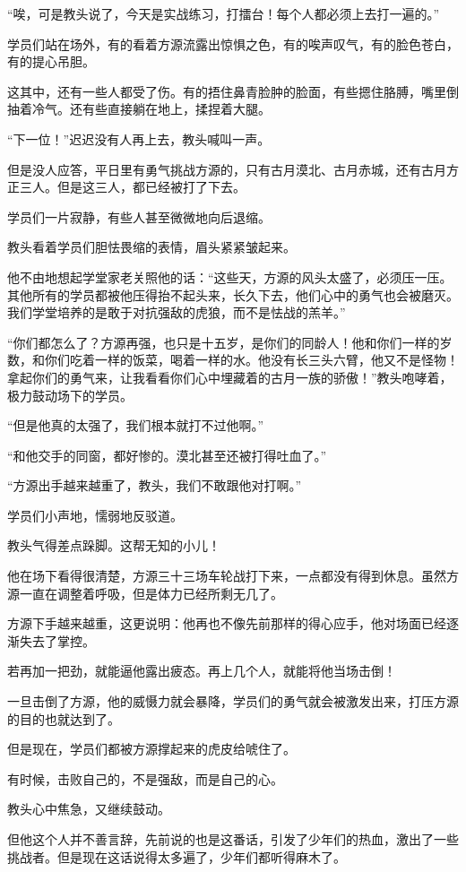\begin{this_body}
“唉，可是教头说了，今天是实战练习，打擂台！每个人都必须上去打一遍的。”

学员们站在场外，有的看着方源流露出惊惧之色，有的唉声叹气，有的脸色苍白，有的提心吊胆。

这其中，还有一些人都受了伤。有的捂住鼻青脸肿的脸面，有些摁住胳膊，嘴里倒抽着冷气。还有些直接躺在地上，揉捏着大腿。

“下一位！”迟迟没有人再上去，教头喊叫一声。

但是没人应答，平日里有勇气挑战方源的，只有古月漠北、古月赤城，还有古月方正三人。但是这三人，都已经被打了下去。

学员们一片寂静，有些人甚至微微地向后退缩。

教头看着学员们胆怯畏缩的表情，眉头紧紧皱起来。

他不由地想起学堂家老关照他的话：“这些天，方源的风头太盛了，必须压一压。其他所有的学员都被他压得抬不起头来，长久下去，他们心中的勇气也会被磨灭。我们学堂培养的是敢于对抗强敌的虎狼，而不是怯战的羔羊。”

“你们都怎么了？方源再强，也只是十五岁，是你们的同龄人！他和你们一样的岁数，和你们吃着一样的饭菜，喝着一样的水。他没有长三头六臂，他又不是怪物！拿起你们的勇气来，让我看看你们心中埋藏着的古月一族的骄傲！”教头咆哮着，极力鼓动场下的学员。

“但是他真的太强了，我们根本就打不过他啊。”

“和他交手的同窗，都好惨的。漠北甚至还被打得吐血了。”

“方源出手越来越重了，教头，我们不敢跟他对打啊。”

学员们小声地，懦弱地反驳道。

教头气得差点跺脚。这帮无知的小儿！

他在场下看得很清楚，方源三十三场车轮战打下来，一点都没有得到休息。虽然方源一直在调整着呼吸，但是体力已经所剩无几了。

方源下手越来越重，这更说明：他再也不像先前那样的得心应手，他对场面已经逐渐失去了掌控。

若再加一把劲，就能逼他露出疲态。再上几个人，就能将他当场击倒！

一旦击倒了方源，他的威慑力就会暴降，学员们的勇气就会被激发出来，打压方源的目的也就达到了。

但是现在，学员们都被方源撑起来的虎皮给唬住了。

有时候，击败自己的，不是强敌，而是自己的心。

教头心中焦急，又继续鼓动。

但他这个人并不善言辞，先前说的也是这番话，引发了少年们的热血，激出了一些挑战者。但是现在这话说得太多遍了，少年们都听得麻木了。


\end{this_body}
